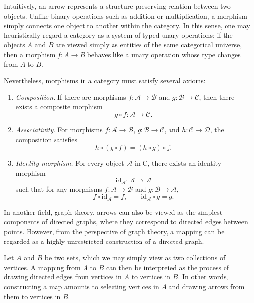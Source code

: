 \documentclass[11pt]{book}
\theoremstyle{definition}
\theoremstyle{plain}
\theoremstyle{remark}
\begin{document}
Intuitively, an arrow represents a structure-preserving relation between two objects. 
Unlike binary operations such as addition or multiplication, a morphism simply connects 
one object to another within the category. In this sense, one may heuristically regard a 
category as a system of typed unary operations: if the objects $A$ and $B$ are viewed simply 
as entities of the same categorical universe, then a morphism $f : A \to B$ behaves like a 
unary operation whose type changes from $A$ to $B$.

Nevertheless, morphisms in a category must satisfy several axioms:

\begin{enumerate}
\item \emph{Composition.}  
If there are morphisms $f : \mathcal{A} \rightarrow \mathcal{B}$ and 
$g : \mathcal{B} \rightarrow \mathcal{C}$, then there exists a composite morphism
\[
g \circ f : \mathcal{A} \rightarrow \mathcal{C}.
\]

\item \emph{Associativity.}  
For morphisms $f : \mathcal{A} \rightarrow \mathcal{B}$,
$g : \mathcal{B} \rightarrow \mathcal{C}$, and
$h : \mathcal{C} \rightarrow \mathcal{D}$, the composition satisfies
\[
h \circ (g \circ f) 
= 
(h \circ g) \circ f.
\]

\item \emph{Identity morphism.}  
For every object $\mathcal{A}$ in $\mathrm{C}$, there exists an identity morphism
\[
\mathrm{id}_{\mathcal{A}} : \mathcal{A} \rightarrow \mathcal{A}
\]
such that for any morphisms $f : \mathcal{A} \rightarrow \mathcal{B}$ and
$g : \mathcal{B} \rightarrow \mathcal{A}$,
\[
f \circ \mathrm{id}_{\mathcal{A}} = f, 
\qquad
\mathrm{id}_{\mathcal{A}} \circ g = g.
\]
\end{enumerate}

In another field, graph theory, arrows can also be viewed as the simplest components 
of directed graphs, where they correspond to directed edges between points. However, 
from the perspective of graph theory, a mapping can be regarded as a highly unrestricted 
construction of a directed graph. 

Let $A$ and $B$ be two sets, which we may simply view as two collections of vertices. 
A mapping from $A$ to $B$ can then be interpreted as the process of drawing directed 
edges from vertices in $A$ to vertices in $B$. In other words, constructing a map amounts 
to selecting vertices in $A$ and drawing arrows from them to vertices in $B$.
\end{document}
